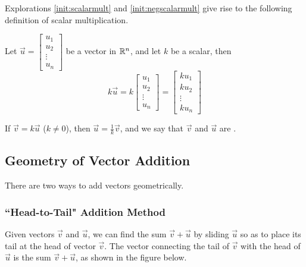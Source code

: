 \documentclass{ximera}
\begin{document}
Explorations  \ref{init:scalarmult} and \ref{init:negscalarmult} give rise to the following definition of scalar multiplication.


  \begin{definition}\label{def:scalarmult} 
  
Let $\vec{u}=\begin{bmatrix}
u_1\\
u_2\\
\vdots\\
u_n
\end{bmatrix}$ be a vector in $\mathbb{R}^n$, and let $k$ be a scalar, then
  $$k\vec{u}=k\begin{bmatrix}
u_1\\
u_2\\
\vdots\\
u_n
\end{bmatrix}=\begin{bmatrix}
ku_1\\
ku_2\\
\vdots\\
ku_n
\end{bmatrix}$$
  \end{definition}
If $\vec{v}=k\vec{u}$ ($k\neq 0$), then $\vec{u}=\frac{1}{k}\vec{v}$, and we say that $\vec{v}$ and $\vec{u}$ are .

\subsection*{Geometry of Vector Addition} 
There are two ways to add vectors geometrically.  
\subsubsection*{``Head-to-Tail" Addition Method}
Given vectors $\vec{v}$ and $\vec{u}$, we can find the sum $\vec{v}+\vec{u}$ by sliding $\vec{u}$ so as to place its tail at the head of vector $\vec{v}$.  The vector connecting the tail of $\vec{v}$ with the head of $\vec{u}$ is the sum $\vec{v}+\vec{u}$, as shown in the figure below.    
\begin{image}[4in]
\end{image}
\end{document}
